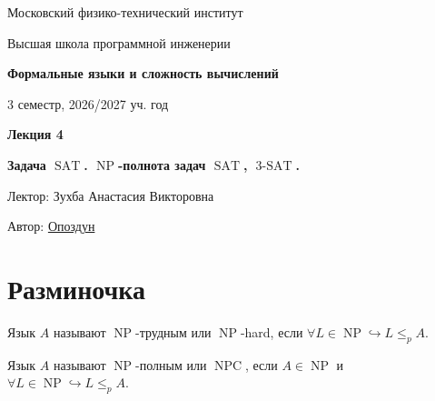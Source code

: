 \documentclass[11pt]{article}
\DeclareMathOperator{\SAT}{SAT}
\DeclareMathOperator{\tSAT}{3-SAT}
\DeclareMathOperator{\NP}{NP}
\DeclareMathOperator{\NPC}{NPC}
\newcommand{\lectureNumber}{4}
\newcommand{\lectureTitle}{Задача $\SAT$. $\NP$-полнота задач $\SAT$, $\tSAT$.}
\newcommand{\courseName}{Формальные языки и сложность вычислений}
\newcommand{\semester}{3 семестр, 2026/2027 уч. год}
\begin{document}
\begin{titlepage}
    \centering
    
    {\large Московский физико-технический институт \par}
    {\large Высшая школа программной инженерии \par}
    \vspace{2cm}

    {\Large \textbf{\courseName} \par}
    {\large \semester \par}
    
    \vspace*{\fill}

    {\Huge \textbf{Лекция \lectureNumber} \par}
    {\Huge \textbf{\lectureTitle} \par}
    
    \vspace*{\fill}
    
    {\large Лектор: Зухба Анастасия Викторовна \par}
    {\large Автор: \href{https://t.me/lost_luna}{Опоздун} \par}

\end{titlepage}


\section{Разминочка}

\begin{definition}
    Язык $A$ называют $\NP$-трудным или $\NP$-hard, если $\forall L \in \NP \hookrightarrow L \leq_p A$.
\end{definition}

\begin{definition}
    Язык $A$ называют $\NP$-полным или $\NPC$, если $A \in \NP$ и $\forall L \in \NP \hookrightarrow L \leq_p A$.
\end{definition}
\end{document}
